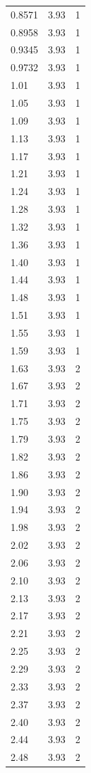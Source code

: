 \begin{longtable}{lrr}
  0.8571 & 3.93 & 1 \\
  0.8958 & 3.93 & 1 \\
  0.9345 & 3.93 & 1 \\
  0.9732 & 3.93 & 1 \\
  1.01 & 3.93 & 1 \\
  1.05 & 3.93 & 1 \\
  1.09 & 3.93 & 1 \\
  1.13 & 3.93 & 1 \\
  1.17 & 3.93 & 1 \\
  1.21 & 3.93 & 1 \\
  1.24 & 3.93 & 1 \\
  1.28 & 3.93 & 1 \\
  1.32 & 3.93 & 1 \\
  1.36 & 3.93 & 1 \\
  1.40 & 3.93 & 1 \\
  1.44 & 3.93 & 1 \\
  1.48 & 3.93 & 1 \\
  1.51 & 3.93 & 1 \\
  1.55 & 3.93 & 1 \\
  1.59 & 3.93 & 1 \\
  1.63 & 3.93 & 2 \\
  1.67 & 3.93 & 2 \\
  1.71 & 3.93 & 2 \\
  1.75 & 3.93 & 2 \\
  1.79 & 3.93 & 2 \\
  1.82 & 3.93 & 2 \\
  1.86 & 3.93 & 2 \\
  1.90 & 3.93 & 2 \\
  1.94 & 3.93 & 2 \\
  1.98 & 3.93 & 2 \\
  2.02 & 3.93 & 2 \\
  2.06 & 3.93 & 2 \\
  2.10 & 3.93 & 2 \\
  2.13 & 3.93 & 2 \\
  2.17 & 3.93 & 2 \\
  2.21 & 3.93 & 2 \\
  2.25 & 3.93 & 2 \\
  2.29 & 3.93 & 2 \\
  2.33 & 3.93 & 2 \\
  2.37 & 3.93 & 2 \\
  2.40 & 3.93 & 2 \\
  2.44 & 3.93 & 2 \\
  2.48 & 3.93 & 2 \\

\end{longtable}
